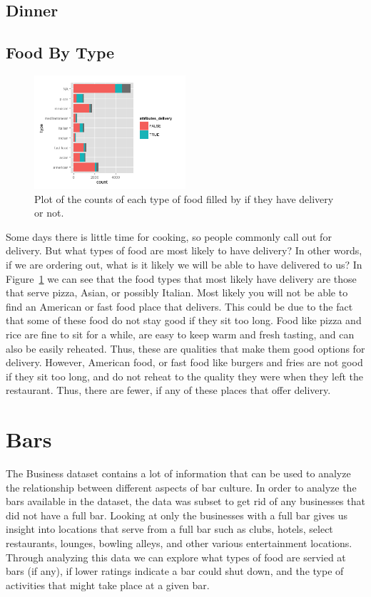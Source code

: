 \documentclass[11pt]{article}
\begin{document}
\subsection{Dinner}

\subsection{Food By Type}

\begin{figure}[h!]
  \caption{Plot of the counts of each type of food filled by if they have delivery or not.}
  \centering
  \label{delivery}
    \includegraphics[width=0.5\textwidth]{Figures/delivery.png}
\end{figure}

Some days there is little time for cooking, so people commonly call out for delivery.  But what types of food are most likely to have delivery?  In other words, if we are ordering out, what is it likely we will be able to have delivered to us? In 
Figure~\ref{delivery} we can see that the food types that most likely have delivery are those that serve pizza, Asian, or possibly Italian.  Most likely you will not be able to find an American or fast food place that delivers.  This could be due to the fact that some of these food do not stay good if they sit too long.  Food like pizza and rice are fine to sit for a while,  are easy to keep warm and fresh tasting, and can also be easily reheated. Thus, these are qualities that make them good options for delivery.  However, American food, or fast food like burgers and fries are not good if they sit too long, and do not reheat to the quality they were when they left the restaurant.  Thus, there are fewer, if any of these places that offer delivery.
\section{Bars}

The Business dataset contains a lot of information that can be used to analyze the relationship between different aspects of bar culture.  In order to analyze the bars available in the dataset, the data was subset to get rid of any businesses that did not have a full bar.  Looking at only the businesses with a full bar gives us insight into locations that serve from a full bar such as clubs, hotels, select restaurants, lounges, bowling alleys, and other various entertainment locations.  Through analyzing this data we can explore what types of food are servied at bars (if any), if lower ratings indicate a bar could shut down, and the type of activities that might take place at a given bar.
\end{document}
